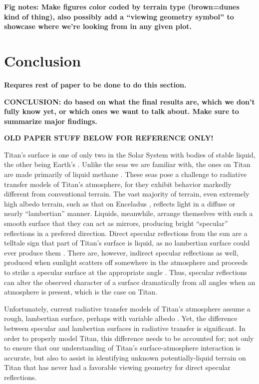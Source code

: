 \documentclass[twocolumn,linenumbers]{aastex631}
\begin{document}
\textbf{\color{blue}Fig notes: Make figures color coded by terrain type (brown=dunes kind of thing), also possibly add a ``viewing geometry symbol'' to showcase where we're looking from in any given plot.\color{black}}

\section{Conclusion} \label{sec:conclusion}

\textbf{\color{blue}Requres rest of paper to be done to do this section.\color{black}}

\textbf{\color{blue}CONCLUSION: do based on what the final results are, which we don't fully know yet, or which ones we want to talk about. Make sure to summarize major findings. \color{black}}

\textbf{\color{red}OLD PAPER STUFF BELOW FOR REFERENCE ONLY!\color{black}}

Titan's surface is one of only two in the Solar System with bodies of stable liquid, the other being Earth's \citep{Hayes2016}. Unlike the seas we are familiar with, the ones on Titan are made primarily of liquid methane \citep{Mastrogiuseppe2016}. These seas pose a challenge to radiative transfer models of Titan's atmosphere, for they exhibit behavior markedly different from conventional terrain. The vast majority of terrain, even extremely high albedo terrain, such as that on Enceladus \citep{Li2023}, reflects light in a diffuse or nearly ``lambertian'' manner. Liquids, meanwhile, arrange themselves with such a smooth surface that they can act as mirrors, producing bright ``specular'' reflections in a prefered direction. Direct specular reflections from the sun are a telltale sign that part of Titan's surface is liquid, as no lambertian surface could ever produce them \citep{Stephan2010}. There are, however, indirect specular reflections as well, produced when sunlight scatters off somewhere in the atmosphere and proceeds to strike a specular surface at the appropriate angle \citep{Vixie2015}. Thus, specular reflections can alter the observed character of a surface dramatically from all angles when an atmosphere is present, which is the case on Titan.

Unfortunately, current radiative transfer models of Titan's atmosphere assume a rough, lambertian surface, perhaps with variable albedo \citep{Griffith2012, Xu2013, Corlies2021, Rannou2021, EsSayeh2023}. Yet, the difference between specular and lambertian surfaces in radiative transfer is significant. In order to properly model Titan, this difference needs to be accounted for; not only to ensure that our understanding of Titan's surface-atmosphere interaction is accurate, but also to assist in identifying unknown potentially-liquid terrain on Titan that has never had a favorable viewing geometry for direct specular reflections. 
\end{document}
